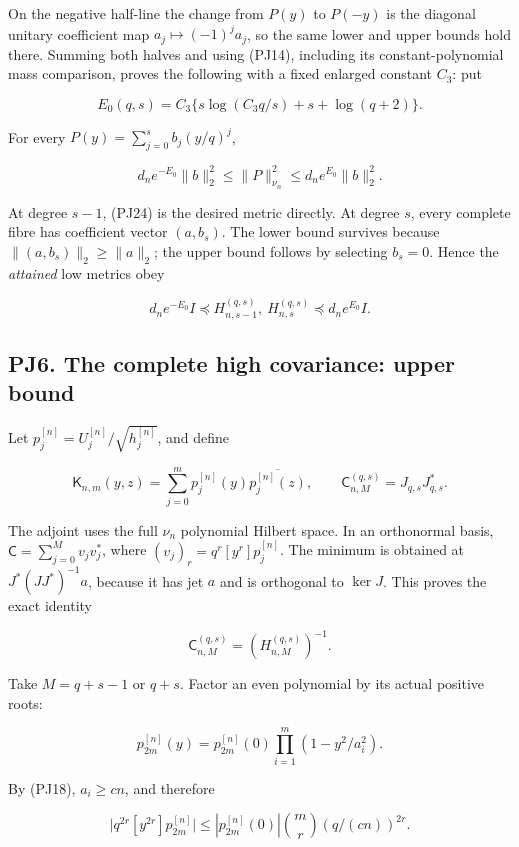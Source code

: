 \documentclass[10pt]{article}
\begin{document}
On the negative half-line the change from \(P(y)\) to \(P(-y)\) is the diagonal unitary coefficient map \(a_j\mapsto(-1)^ja_j\), so the same lower and upper bounds hold there. Summing both halves and using (PJ14), including its constant-polynomial mass comparison, proves the following with a fixed enlarged constant \(C_3\): put

\[
E_0(q,s)=C_3\{s\log(C_3q/s)+s+\log(q+2)\}.
\tag{PJ23}
\]

For every \(P(y)=\sum_{j=0}^{s}b_j(y/q)^j\),

\[
d_ne^{-E_0}\|b\|_2^2\le\|P\|_{\nu_n}^2
\le d_ne^{E_0}\|b\|_2^2.
\tag{PJ24}
\]

At degree \(s-1\), (PJ24) is the desired metric directly. At degree \(s\), every complete fibre has coefficient vector \((a,b_s)\). The lower bound survives because \(\|(a,b_s)\|_2\ge\|a\|_2\); the upper bound follows by selecting \(b_s=0\). Hence the \emph{attained} low metrics obey

\[
d_ne^{-E_0}I\preceq H_{n,s-1}^{(q,s)},\ H_{n,s}^{(q,s)}
\preceq d_ne^{E_0}I.
\tag{PJ25}
\]

\subsection{PJ6. The complete high covariance: upper bound}\label{pj6.-the-complete-high-covariance-upper-bound}

Let \(p_j^{[n]}=U_j^{[n]}/\sqrt{h_j^{[n]}}\), and define

\[
\mathsf K_{n,m}(y,z)=\sum_{j=0}^mp_j^{[n]}(y)\overline{p_j^{[n]}(z)},
\qquad
\mathsf C_{n,M}^{(q,s)}=J_{q,s}J_{q,s}^*.
\tag{PJ26}
\]

The adjoint uses the full \(\nu_n\) polynomial Hilbert space. In an orthonormal basis, \(\mathsf C=\sum_{j=0}^M v_jv_j^*\), where \((v_j)_r=q^r[y^r]p_j^{[n]}\). The minimum is obtained at \(J^*(JJ^*)^{-1}a\), because it has jet \(a\) and is orthogonal to \(\ker J\). This proves the exact identity

\[
\mathsf C_{n,M}^{(q,s)}=(H_{n,M}^{(q,s)})^{-1}.
\tag{PJ27}
\]

Take \(M=q+s-1\) or \(q+s\). Factor an even polynomial by its actual positive roots:

\[
p_{2m}^{[n]}(y)=p_{2m}^{[n]}(0)
\prod_{i=1}^{m}(1-y^2/a_i^2).
\]

By (PJ18), \(a_i\ge cn\), and therefore

\[
\big|q^{2r}[y^{2r}]p_{2m}^{[n]}\big|
\le|p_{2m}^{[n]}(0)|\binom mr(q/(cn))^{2r}.
\tag{PJ28}
\]
\end{document}
